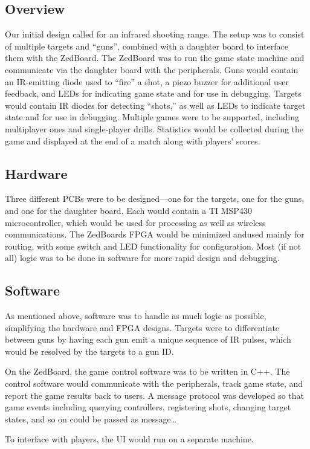 \documentclass[oneside]{book}
\begin{document}
\subsection{Overview}

Our initial design called for an infrared shooting range.
The setup was to consist of multiple targets and ``guns'',
combined with a daughter board to interface them with the ZedBoard.
The ZedBoard was to run the game state machine and communicate via the daughter board
with the peripherals.
Guns would contain an IR-emitting diode used to ``fire'' a shot,
a piezo buzzer for additional user feedback,
and LEDs for indicating game state and for use in debugging.
Targets would contain IR diodes for detecting ``shots,''
as well as LEDs to indicate target state and for use in debugging.
Multiple games were to be supported,
including multiplayer ones and single-player drills.
Statistics would be collected during the game and displayed at the end of a match
along with players' scores.

\subsection{Hardware}

Three different PCBs were to be designed---one for the targets, one for the guns,
and one for the daughter board.
Each would contain a TI MSP430 microcontroller, which would be used for processing
as well as wireless communications.
The ZedBoards FPGA would be minimized andused mainly for routing,
with some switch and LED functionality for configuration.
Most (if not all) logic was to be done in software for more rapid design and debugging.

\subsection{Software}

As mentioned above, software was to handle as much logic as possible,
simplifying the hardware and FPGA designs.
Targets were to differentiate between guns by having each gun emit a unique
sequence of IR pulses, which would be resolved by the targets to a gun ID.

On the ZedBoard, the game control software was to be written in C++.
The control software would communicate with the peripherals, track game state,
and report the game results back to users.
A message protocol was developed so that game events including querying controllers,
registering shots, changing target states, and so on could be passed as message\ldots


To interface with players, the UI would run on a separate machine.
\end{document}
